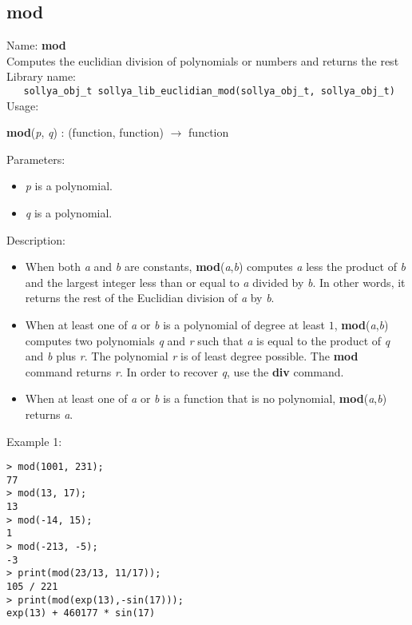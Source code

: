 \subsection{mod}
\label{labeuclmod}
\noindent Name: \textbf{mod}\\
\phantom{aaa}Computes the euclidian division of polynomials or numbers and returns the rest\\[0.2cm]
\noindent Library name:\\
\verb|   sollya_obj_t sollya_lib_euclidian_mod(sollya_obj_t, sollya_obj_t)|\\[0.2cm]
\noindent Usage: 
\begin{center}
\textbf{mod}(\emph{p}, \emph{q}) : (\textsf{function}, \textsf{function}) $\rightarrow$ \textsf{function}\\
\end{center}
Parameters: 
\begin{itemize}
\item \emph{p} is a polynomial.
\item \emph{q} is a polynomial.
\end{itemize}
\noindent Description: \begin{itemize}

\item When both \emph{a} and \emph{b} are constants, \textbf{mod}(\emph{a},\emph{b}) computes \emph{a}
   less the product of \emph{b} and the largest integer less than or equal to
   \emph{a} divided by \emph{b}. In other words, it returns the rest of the
   Euclidian division of \emph{a} by \emph{b}.

\item When at least one of \emph{a} or \emph{b} is a polynomial of degree at least
   $1$, \textbf{mod}(\emph{a},\emph{b}) computes two polynomials \emph{q} and \emph{r} such
   that \emph{a} is equal to the product of \emph{q} and \emph{b} plus \emph{r}. The
   polynomial \emph{r} is of least degree possible. The \textbf{mod} command
   returns \emph{r}. In order to recover \emph{q}, use the \textbf{div} command.

\item When at least one of \emph{a} or \emph{b} is a function that is no polynomial,
   \textbf{mod}(\emph{a},\emph{b}) returns \emph{a}.
\end{itemize}
\noindent Example 1: 
\begin{center}\begin{minipage}{15cm}\begin{Verbatim}[frame=single]
> mod(1001, 231);
77
> mod(13, 17);
13
> mod(-14, 15);
1
> mod(-213, -5);
-3
> print(mod(23/13, 11/17));
105 / 221
> print(mod(exp(13),-sin(17)));
exp(13) + 460177 * sin(17)
\end{Verbatim}
\end{minipage}\end{center}
